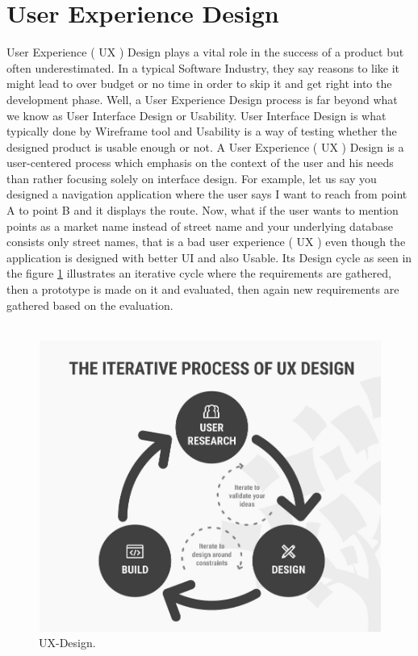 \section{User Experience Design} 

User Experience ( UX ) Design plays a vital role in the success of a product but often underestimated. In a typical Software Industry, they say reasons to like it might lead to over budget or no time in order to skip it and get right into the development phase. Well, a User Experience Design process is far beyond what we know as User Interface Design or Usability.  User Interface Design is what typically done by Wireframe tool and Usability is a way of testing whether the designed product is usable enough or not. A User Experience ( UX ) Design is a user-centered process which emphasis on the context of the user and his needs than rather focusing solely on interface design. \cite{UX} For example, let us say you designed a navigation application where the user says I want to reach from point A to point B and it displays the route. Now, what if the user wants to mention points as a market name instead of street name and your underlying database consists only street names, that is a bad user experience ( UX ) even though the application is designed with better UI and also Usable. Its Design \cite{UXD} cycle as seen in the figure \ref{fig:ux-design} illustrates an iterative cycle where the requirements are gathered, then a prototype is made on it and evaluated, then again new requirements are gathered based on the evaluation. \\ \\

\begin{figure}[hbt!]
	\centering
	\includegraphics[width=\linewidth]{figures/ux-design}
	\caption{UX-Design.}
	\label{fig:ux-design}
\end{figure}

\let\cleardoublepage\clearpage
